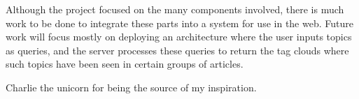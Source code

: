 \documentclass[a0paper, portrait]{baposter}
\begin{document}
\begin{poster}
   {
    Although the project focused on the many components involved, there is much work to be done to integrate these parts into a system for use in the web. Future work will focus mostly on deploying an architecture where the user inputs topics as queries, and the server processes these queries to return the tag clouds where such topics have been seen in certain groups of articles.
  }
  
   {
    {\selectfont Charlie the unicorn for being the source of my inspiration.}
  }

\end{poster}
\end{document}
